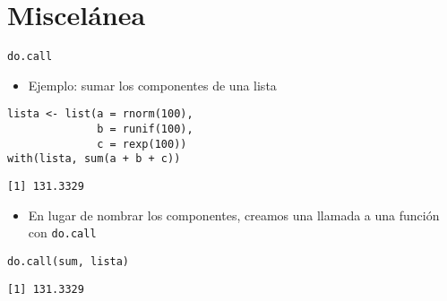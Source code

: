 \documentclass[xcolor={usenames,svgnames,dvipsnames}]{beamer}
\begin{document}
\section{Miscelánea}
\label{sec:orgheadline33}
\begin{frame}[fragile,label={sec:orgheadline28}]{\texttt{do.call}}
 \begin{itemize}
\item Ejemplo: sumar los componentes de una lista
\end{itemize}
\lstset{language=R,label= ,caption= ,captionpos=b,numbers=none}
\begin{lstlisting}
lista <- list(a = rnorm(100),
              b = runif(100),
              c = rexp(100))
with(lista, sum(a + b + c))
\end{lstlisting}

\begin{verbatim}
[1] 131.3329
\end{verbatim}

\begin{itemize}
\item En lugar de nombrar los componentes, creamos una llamada a una
función con \texttt{do.call}
\end{itemize}
\lstset{language=R,label= ,caption= ,captionpos=b,numbers=none}
\begin{lstlisting}
do.call(sum, lista)
\end{lstlisting}

\begin{verbatim}
[1] 131.3329
\end{verbatim}
\end{frame}
\end{document}
